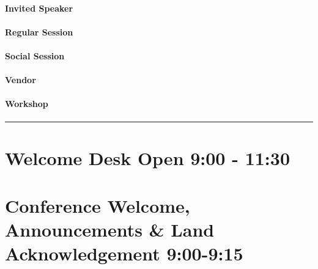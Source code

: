 \documentclass[
]{book}
\begin{document}
\begin{speaker}
\hypertarget{invited-speaker}{%
\paragraph{Invited Speaker}\label{invited-speaker}}
\end{speaker}

\begin{session}
\hypertarget{regular-session}{%
\paragraph{Regular Session}\label{regular-session}}
\end{session}
\begin{social}
\hypertarget{social-session}{%
\paragraph{Social Session}\label{social-session}}
\end{social}
\begin{vendor}
\hypertarget{vendor}{%
\paragraph{Vendor}\label{vendor}}
\end{vendor}

\begin{workshop}
\hypertarget{workshop}{%
\paragraph{Workshop}\label{workshop}}
\end{workshop}

\begin{center}\rule{0.5\linewidth}{0.5pt}\end{center}

\hypertarget{welcome-desk-open-900---1130-1}{%
\section*{Welcome Desk Open \textbar{} 9:00 - 11:30}\label{welcome-desk-open-900---1130-1}}

\hypertarget{conference-welcome-announcements-land-acknowledgement-900-915-1}{%
\section*{Conference Welcome, Announcements \& Land Acknowledgement \textbar{} 9:00-9:15}\label{conference-welcome-announcements-land-acknowledgement-900-915-1}}
\end{document}
